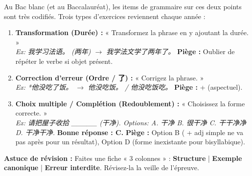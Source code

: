 \documentclass[11pt]{article}
\newcommand{\zh}[1]{\ifmmode\text{#1}\else{#1}\fi}
\begin{document}
\begin{savaistu}
Au Bac blanc (et au Baccalauréat), les items de grammaire sur ces deux points sont très codifiés. Trois types d'exercices reviennent chaque année :
\begin{enumerate}
    \item \textbf{Transformation (Durée) :} « Transformez la phrase en y ajoutant la durée. » \\
    \emph{Ex: 我学习法语。 (两年) $\rightarrow$ 我学法文学了两年了。} \textbf{Piège :} Oublier de répéter le verbe si objet présent.
    \item \textbf{Correction d'erreur (Ordre / 了) :} « Corrigez la phrase. » \\
    \emph{Ex: *他没吃了饭。 $\rightarrow$ 他没吃饭。 / 他没吃饭吃。} \textbf{Piège :} \zh{没} + \zh{led} (aspectuel).
    \item \textbf{Choix multiple / Complétion (Redoublement) :} « Choisissez la forme correcte. » \\
    \emph{Ex: 请把屋子收拾 \_\_\_\_\_ (干净). Options: A. 干净 B. 很干净 C. 干干净净 D. 干净干净.} \textbf{Bonne réponse : C.} \textbf{Piège :} Option B (\zh{很} + adj simple ne va pas après \zh{得} pour un résultat), Option D (forme inexistante pour bisyllabique).
\end{enumerate}
\textbf{Astuce de révision :} Faites une fiche « 3 colonnes » : \textbf{Structure} | \textbf{Exemple canonique} | \textbf{Erreur interdite}. Révisez-la la veille de l'épreuve.
\end{savaistu}
\end{document}
